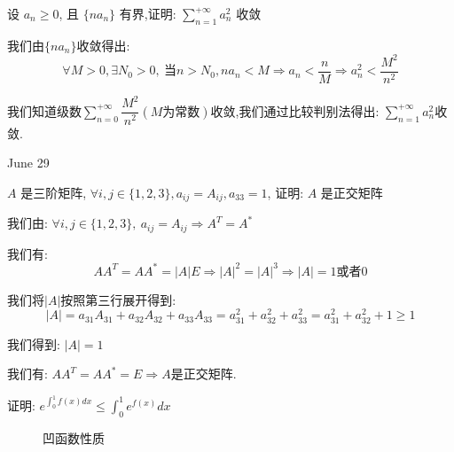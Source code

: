 \begin{example}[][Exam: 32.4.14]
	设 $a_{n}\geq 0$, 且 $\{na_{n}\}$ 有界,证明: $\sum\limits_{n=1}^{+\infty}a_{n}^2$ 收敛
\end{example}

\begin{solution}
	
	我们由$\{na_{n}\}$收敛得出: 
	$$\forall M>0, \exists N_{0}>0,\ \text{当}n>N_{0}, na_{n}<M\Rightarrow a_{n}<\dfrac{n}{M}\Rightarrow a_{n}^2<\dfrac{M^2}{n^2} $$
	
	我们知道级数$\sum\limits_{n=0}^{+\infty}\dfrac{M^2}{n^2}(M\text{为常数})$收敛,我们通过比较判别法得出: $\sum\limits_{n=1}^{+\infty}a_{n}^2$收敛.
\end{solution}


\textcolor{purplea}{June 29}

\begin{example}[][Exam: 32.4.15]
	$A$ 是三阶矩阵, $\forall i,j\in\{1,2,3\}, a_{ij}=A_{ij},a_{33}=1$, 证明: $A$ 是正交矩阵
\end{example}

\begin{solution}
	
	我们由: $\forall i,j\in\{1,2,3\},\ a_{ij}=A_{ij}\Rightarrow A^{T}=A^{*}$
	
	我们有: $$AA^{T}=AA^{*}=|A|E\Rightarrow |A|^2=|A|^3\Rightarrow |A|=1\text{或者}0$$
	
	我们将$|A|$按照第三行展开得到: $$|A|=a_{31}A_{31}+a_{32}A_{32}+a_{33}A_{33}=a_{31}^2+a_{32}^2+a_{33}^2=a_{31}^2+a_{32}^2+1\geq 1$$
	
	我们得到: $|A|=1$
	
	我们有: $AA^{T}=AA^{*}=E\Rightarrow A\text{是正交矩阵}$.
\end{solution}

\begin{example}[][Exam: 32.4.16]
	证明: $e^{\int_{0}^{1}f(x)dx}\leq \int_{0}^{1}e^{f(x)}dx$
\end{example}

\begin{figure}[ht]
	\centering
	\caption{凹函数性质}
	\label{Figure: 凹函数性质}
\end{figure}

